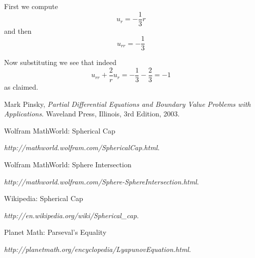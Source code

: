 \documentclass[12pt]{article}
\begin{document}
First we compute
\[u_r=-\frac{1}{3} r\]
and then
\[u_{rr}=-\frac{1}{3} \]

Now substituting we see that indeed 
\[ u_{rr} +\frac{2}{r} u_r = -\frac{1}{3} -\frac{2}{3} = -1 \]
as claimed.

\begin{thebibliography}{9}

	  Mark Pinsky,
	  \emph{Partial Differential Equations and Boundary Value Problems with Applications}.
	  Waveland Press, Illinois,
	  3rd Edition,
	  2003.

	  Wolfram MathWorld: Spherical Cap

	  \emph{http://mathworld.wolfram.com/SphericalCap.html}.

	  Wolfram MathWorld: Sphere Intersection

	  \emph{http://mathworld.wolfram.com/Sphere-SphereIntersection.html}.

	  Wikipedia: Spherical Cap

	  \emph{http://en.wikipedia.org/wiki/Spherical\_cap}.

	  Planet Math: Parseval's Equality

	  \emph{http://planetmath.org/encyclopedia/LyapunovEquation.html}.


\end{thebibliography}
\end{document}
